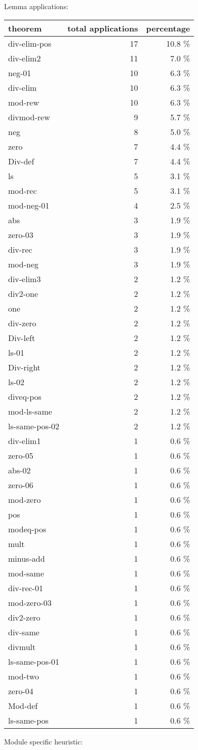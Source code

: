 \documentclass[a4paper]{article}
\begin{document}
Lemma applications:

\begin{supertabular}{l|r|r}
theorem	        & total applications & percentage \\ \hline
div-elim-pos & 17 & 10.8 \% \\
div-elim2 & 11 & 7.0 \% \\
neg-01 & 10 & 6.3 \% \\
div-elim & 10 & 6.3 \% \\
mod-rew & 10 & 6.3 \% \\
divmod-rew & 9 & 5.7 \% \\
neg & 8 & 5.0 \% \\
zero & 7 & 4.4 \% \\
Div-def & 7 & 4.4 \% \\
ls & 5 & 3.1 \% \\
mod-rec & 5 & 3.1 \% \\
mod-neg-01 & 4 & 2.5 \% \\
abs & 3 & 1.9 \% \\
zero-03 & 3 & 1.9 \% \\
div-rec & 3 & 1.9 \% \\
mod-neg & 3 & 1.9 \% \\
div-elim3 & 2 & 1.2 \% \\
div2-one & 2 & 1.2 \% \\
one & 2 & 1.2 \% \\
div-zero & 2 & 1.2 \% \\
Div-left & 2 & 1.2 \% \\
ls-01 & 2 & 1.2 \% \\
Div-right & 2 & 1.2 \% \\
ls-02 & 2 & 1.2 \% \\
diveq-pos & 2 & 1.2 \% \\
mod-ls-same & 2 & 1.2 \% \\
ls-same-pos-02 & 2 & 1.2 \% \\
div-elim1 & 1 & 0.6 \% \\
zero-05 & 1 & 0.6 \% \\
abs-02 & 1 & 0.6 \% \\
zero-06 & 1 & 0.6 \% \\
mod-zero & 1 & 0.6 \% \\
pos & 1 & 0.6 \% \\
modeq-pos & 1 & 0.6 \% \\
mult & 1 & 0.6 \% \\
minus-add & 1 & 0.6 \% \\
mod-same & 1 & 0.6 \% \\
div-rec-01 & 1 & 0.6 \% \\
mod-zero-03 & 1 & 0.6 \% \\
div2-zero & 1 & 0.6 \% \\
div-same & 1 & 0.6 \% \\
divmult & 1 & 0.6 \% \\
ls-same-pos-01 & 1 & 0.6 \% \\
mod-two & 1 & 0.6 \% \\
zero-04 & 1 & 0.6 \% \\
Mod-def & 1 & 0.6 \% \\
ls-same-pos & 1 & 0.6 \% \\

\end{supertabular}

Module specific heuristic:
\end{document}
